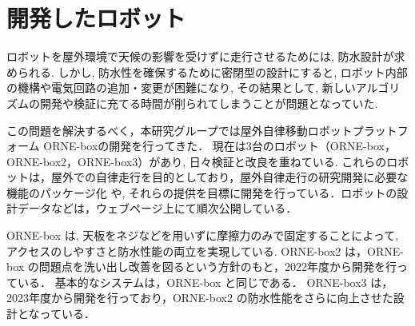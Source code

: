 \documentclass[uplatex, twocolumn, 9pt]{jsproceedings}
\begin{document}
\section{開発したロボット}




ロボットを屋外環境で天候の影響を受けずに走行させるためには, 防水設計が求められる.
しかし, 防水性を確保するために密閉型の設計にすると, ロボット内部の機構や電気回路の追加・変更が困難になり, 
その結果として, 新しいアルゴリズムの開発や検証に充てる時間が削られてしまうことが問題となっていた.

この問題を解決するべく，本研究グループでは屋外自律移動ロボットプラットフォーム ORNE-boxの開発を行ってきた\cite{box}．
現在は3台のロボット（ORNE-box，ORNE-box2，ORNE-box3）があり, 日々検証と改良を重ねている.
これらのロボットは，屋外での自律走行を目的としており，屋外自律走行の研究開発に必要な機能のパッケージ化
や, それらの提供を目標に開発を行っている．ロボットの設計データなどは，ウェブページ上にて順次公開している\cite{box-data}．

ORNE-box は, 天板をネジなどを用いずに摩擦力のみで固定することによって, アクセスのしやすさと防水性能の両立を実現している.
ORNE-box2 は，ORNE-box の問題点を洗い出し改善を図るという方針のもと，2022年度から開発を行っている．
基本的なシステムは，ORNE-box と同じである．
ORNE-box3 は，2023年度から開発を行っており，ORNE-box2 の防水性能をさらに向上させた設計となっている．
\end{document}
